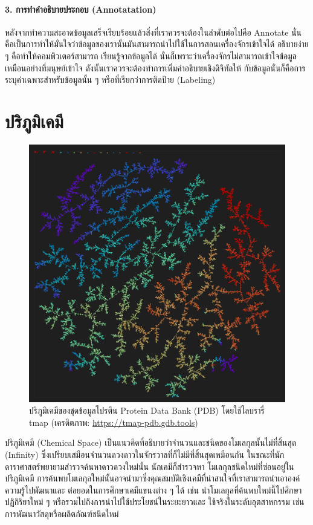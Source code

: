 \paragraph{3. การทำคำอธิบายประกอบ (Annotatation)} หลังจากทำความสะอาดข้อมูลเสร็จเรียบร้อยแล้วสิ่งที่เราควรจะต้องในลำดับต่อไปคือ 
Annotate นั่นคือเป็นการทำให้มั่นใจว่าข้อมูลของเรานั้นมันสามารถนำไปใช้ในการสอนเครื่องจักรเข้าใจได้ อธิบายง่าย ๆ คือทำให้คอมพิวเตอร์สามารถ%
เรียนรู้จากข้อมูลได้ นั่นก็เพราะว่าเครื่องจักรไม่สามารถเข้าใจข้อมูลเหมือนอย่างที่มนุษย์เข้าใจ ดังนั้นเราควรจะต้องทำการเพิ่มคำอธิบายเชิงดิจิทัลให้%
กับข้อมูลนั่นก็คือการระบุค่าเฉพาะสำหรับข้อมูลนั้น ๆ หรือที่เรียกว่าการติดป้าย (Labeling)

\section{ปริภูมิเคมี}
\label{sec:chem_space}

\begin{figure}[htbp]
    \centering
    \includegraphics[width=0.9\linewidth]{fig/peotein_data_bank.png}
    \caption{ปริภูมิเคมีของชุดข้อมูลโปรตีน Protein Data Bank (PDB) โดยใช้ไลบรารี่ tmap 
    (เครดิตภาพ: \url{https://tmap-pdb.gdb.tools})}
    \label{fig:protein_data_bank}
\end{figure}

ปริภูมิเคมี (Chemical Space)\autocite{kirkpatrick2004} เป็นแนวคิดที่อธิบายว่าจำนวนและชนิดของโมเลกุลนั้นไม่ที่สิ้นสุด (Infinity) 
ซึ่งเปรียบเสมือนจำนวนดวงดาวในจักรวาลที่ก็ไม่มีที่สิ้นสุดเหมือนกัน ในขณะที่นักดาราศาสตร์พยายามสำรวจค้นหาดาวดวงใหม่นั้น นักเคมีก็สำรวจหา%
โมเลกุลชนิดใหม่ที่ซ่อนอยู่ในปริภูมิเคมี การค้นพบโมเลกุลใหม่นั้นอาจนำมาซึ่งคุณสมบัติเชิงเคมีที่น่าสนใจที่เราสามารถนำเอาองค์ความรู้ไปพัฒนาและ%
ต่อยอดในการศึกษาเคมีแขนงต่าง ๆ ได้ เช่น นำโมเลกุลที่ค้นพบใหม่นี้ไปศึกษาปฏิกิริยาใหม่ ๆ หรือรวมไปถึงการนำไปใช้ประโยชน์ในระยะยาวและ%
ใช้จริงในระดับอุตสาหกรรม เช่น การพัฒนาวัสดุหรือผลิตภัณฑ์ชนิดใหม่ 

